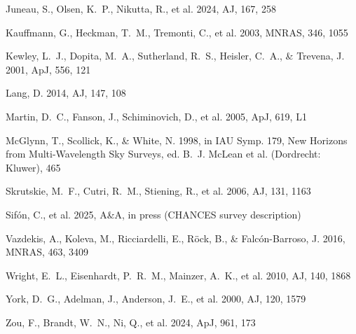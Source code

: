 \documentclass{aa}
\begin{document}
\begin{thebibliography}{}
Juneau, S., Olsen, K.~P., Nikutta, R., et al. 2024, AJ, 167, 258

Kauffmann, G., Heckman, T.~M., Tremonti, C., et al. 2003, MNRAS, 346, 1055

Kewley, L.~J., Dopita, M.~A., Sutherland, R.~S., Heisler, C.~A., \&
Trevena, J. 2001, ApJ, 556, 121

Lang, D. 2014, AJ, 147, 108

Martin, D.~C., Fanson, J., Schiminovich, D., et al. 2005, ApJ, 619, L1

McGlynn, T., Scollick, K., \& White, N. 1998, in IAU Symp. 179, New
Horizons from Multi-Wavelength Sky Surveys, ed. B.~J. McLean et al.
(Dordrecht: Kluwer), 465

Skrutskie, M.~F., Cutri, R.~M., Stiening, R., et al. 2006, AJ, 131, 1163

Sif\'on, C., et al. 2025, A\&A, in press (CHANCES survey description)

Vazdekis, A., Koleva, M., Ricciardelli, E., R\"ock, B., \&
Falc\'on-Barroso, J. 2016, MNRAS, 463, 3409

Wright, E.~L., Eisenhardt, P.~R.~M., Mainzer, A.~K., et al. 2010, AJ,
140, 1868

York, D.~G., Adelman, J., Anderson, J.~E., et al. 2000, AJ, 120, 1579

Zou, F., Brandt, W.~N., Ni, Q., et al. 2024, ApJ, 961, 173

\end{thebibliography}
\end{document}
